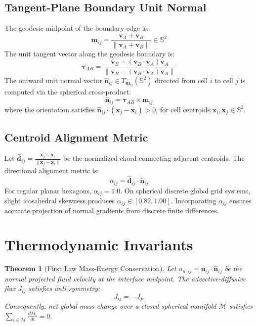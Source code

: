 \documentclass[11pt,a4paper]{article}
\newtheorem{theorem}{Theorem}
\begin{document}
\subsection{Tangent-Plane Boundary Unit Normal}
The geodesic midpoint of the boundary edge is:
\begin{equation}
  \mathbf{m}_{ij} = \frac{\mathbf{v}_A + \mathbf{v}_B}{\|\mathbf{v}_A + \mathbf{v}_B\|} \in \mathbb{S}^2
\end{equation}
The unit tangent vector along the geodesic boundary is:
\begin{equation}
  \boldsymbol{\tau}_{AB} = \frac{\mathbf{v}_B - (\mathbf{v}_B \cdot \mathbf{v}_A)\mathbf{v}_A}{\|\mathbf{v}_B - (\mathbf{v}_B \cdot \mathbf{v}_A)\mathbf{v}_A\|}
\end{equation}
The outward unit normal vector $\hat{\mathbf{n}}_{ij} \in T_{\mathbf{m}_{ij}}(\mathbb{S}^2)$ directed from cell $i$ to cell $j$ is computed via the spherical cross-product:
\begin{equation}
  \hat{\mathbf{n}}_{ij} = \boldsymbol{\tau}_{AB} \times \mathbf{m}_{ij}
\end{equation}
where the orientation satisfies $\hat{\mathbf{n}}_{ij} \cdot (\mathbf{x}_j - \mathbf{x}_i) > 0$, for cell centroids $\mathbf{x}_i, \mathbf{x}_j \in \mathbb{S}^2$.

\subsection{Centroid Alignment Metric}
Let $\hat{\mathbf{d}}_{ij} = \frac{\mathbf{x}_j - \mathbf{x}_i}{\|\mathbf{x}_j - \mathbf{x}_i\|}$ be the normalized chord connecting adjacent centroids. The directional alignment metric is:
\begin{equation}
  \alpha_{ij} = \hat{\mathbf{d}}_{ij} \cdot \hat{\mathbf{n}}_{ij}
\end{equation}
For regular planar hexagons, $\alpha_{ij} = 1.0$. On spherical discrete global grid systems, slight icosahedral skewness produces $\alpha_{ij} \in [0.82, 1.00]$. Incorporating $\alpha_{ij}$ ensures accurate projection of normal gradients from discrete finite differences.

\section{Thermodynamic Invariants}

\begin{theorem}[First Law Mass-Energy Conservation]
Let $u_{n, ij} = \mathbf{u}_{ij} \cdot \hat{\mathbf{n}}_{ij}$ be the normal projected fluid velocity at the interface midpoint. The advective-diffusive flux $J_{ij}$ satisfies anti-symmetry:
\begin{equation}
  J_{ij} = -J_{ji}
\end{equation}
Consequently, net global mass change over a closed spherical manifold $\mathcal{M}$ satisfies $\sum_{i \in \mathcal{M}} \frac{d M_i}{dt} = 0$.
\end{theorem}
\end{document}
